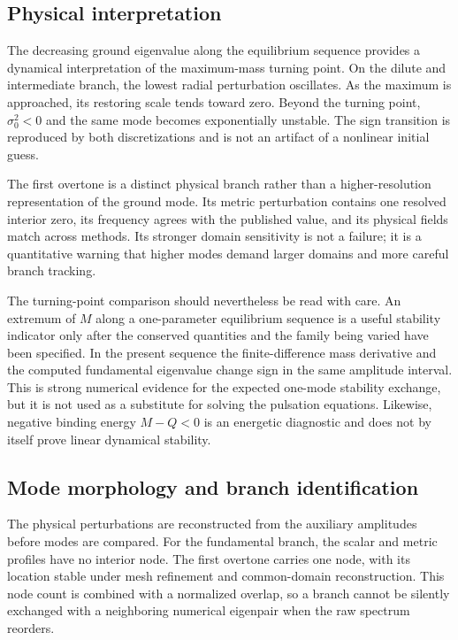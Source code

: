 \documentclass[aps,prd,preprint,onecolumn,nofootinbib,superscriptaddress,showkeys]{revtex4-2}
\begin{document}
\subsection{Physical interpretation}

The decreasing ground eigenvalue along the equilibrium sequence provides a dynamical interpretation of the maximum-mass turning point. On the dilute and intermediate branch, the lowest radial perturbation oscillates. As the maximum is approached, its restoring scale tends toward zero. Beyond the turning point, $\sigma_{0}^{2}<0$ and the same mode becomes exponentially unstable. The sign transition is reproduced by both discretizations and is not an artifact of a nonlinear initial guess.

The first overtone is a distinct physical branch rather than a higher-resolution representation of the ground mode. Its metric perturbation contains one resolved interior zero, its frequency agrees with the published value, and its physical fields match across methods. Its stronger domain sensitivity is not a failure; it is a quantitative warning that higher modes demand larger domains and more careful branch tracking.

The turning-point comparison should nevertheless be read with care. An extremum of $M$ along a one-parameter equilibrium sequence is a useful stability indicator only after the conserved quantities and the family being varied have been specified. In the present sequence the finite-difference mass derivative and the computed fundamental eigenvalue change sign in the same amplitude interval. This is strong numerical evidence for the expected one-mode stability exchange, but it is not used as a substitute for solving the pulsation equations. Likewise, negative binding energy $M-Q<0$ is an energetic diagnostic and does not by itself prove linear dynamical stability.

\subsection{Mode morphology and branch identification}

The physical perturbations are reconstructed from the auxiliary amplitudes before modes are compared. For the fundamental branch, the scalar and metric profiles have no interior node. The first overtone carries one node, with its location stable under mesh refinement and common-domain reconstruction. This node count is combined with a normalized overlap, so a branch cannot be silently exchanged with a neighboring numerical eigenpair when the raw spectrum reorders.
\end{document}
